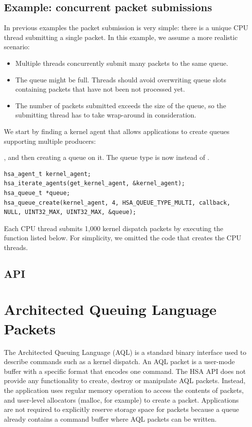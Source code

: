 \documentclass[final,oneside]{book}
\begin{document}
\subsection{Example: concurrent packet submissions}
In previous examples the packet submission is very simple: there is a unique CPU
thread submitting a single packet. In this example, we assume a more realistic
scenario:
\begin{itemize}[itemsep=1pt,topsep=3pt,partopsep=0pt]
\item Multiple threads concurrently submit many packets to the same queue.
\item The queue might be full. Threads should avoid overwriting queue slots
  containing packets that have not been not processed yet.
\item The number of packets submitted exceeds the size of the queue, so the
  submitting thread has to take wrap-around in consideration.
\end{itemize}

We start by finding a kernel agent that allows applications to create queues
supporting multiple producers:

, and then creating a queue on it. The queue type is now
 instead of .
\begin{lstlisting}
hsa_agent_t kernel_agent;
hsa_iterate_agents(get_kernel_agent, &kernel_agent);
hsa_queue_t *queue;
hsa_queue_create(kernel_agent, 4, HSA_QUEUE_TYPE_MULTI, callback, NULL, UINT32_MAX, UINT32_MAX, &queue);
\end{lstlisting}
Each CPU thread submits 1,000 kernel dispatch packets by executing the function
listed below. For simplicity, we omitted the code that creates the CPU threads.


\subsection{API}


\section{Architected Queuing Language Packets}\label{sec:aql} The Architected
Queuing Language (AQL) is a standard binary interface used to describe commands
such as a kernel dispatch. An AQL packet is a user-mode buffer with a specific
format that encodes one command. The HSA API does not provide any functionality
to create, destroy or manipulate AQL packets. Instead, the application uses
regular memory operation to access the contents of packets, and user-level
allocators (malloc, for example) to create a packet. Applications are not
required to explicitly reserve storage space for packets because a
queue already contains a command buffer where AQL packets can be written.
\end{document}
